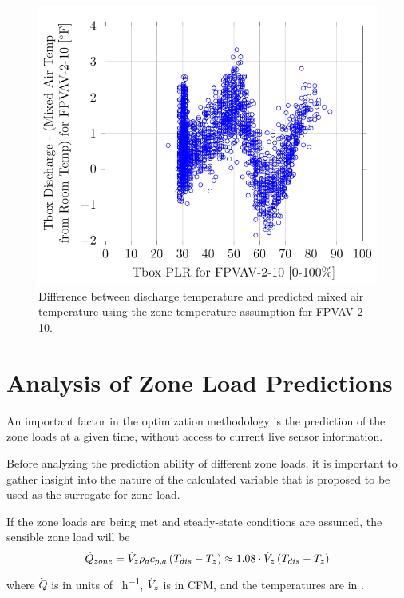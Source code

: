 \begin{figure}
\centering
\includegraphics[]{Plots/2017-01-10-0906-TboxDischargeMixedAirTempfromRoomTempforFPVAV210vsTboxPLRforFPVAV210.pdf}
\caption{Difference between discharge temperature and predicted mixed
air temperature using the zone temperature assumption for FPVAV-2-10.}
\label{fig:2017-01-10-0906-TboxDischargeMixedAirTempfromRoomTempforFPVAV210vsTboxPLRforFPVAV210}
\end{figure}




\section{Analysis of Zone Load Predictions}

An important factor in the optimization methodology is the prediction of
the zone loads at a given time, without access to current live sensor
information. 

Before analyzing the prediction ability of different zone loads, it is
important to gather insight into the nature of the calculated variable
that is proposed to be used as the surrogate for zone load.   

If the zone loads are being met and steady-state conditions are assumed,
the sensible zone load will be
\begin{equation}\label{eq:ApproximateZoneLoad}
    \dot{Q}_{zone}=\dot{V}_{z} \rho_a c_{p,a}{} \left(T_{dis}-T_{z} \right) \approx 1.08 \cdot \dot{V}_{z}\left(T_{dis}-T_{z} \right)
\end{equation}
where \(\dot{Q}\) is in units of \si{\btu\per\hour}, \(\dot{V}_{z}\) is in CFM, and the temperatures are in \si{\degreeF}.

